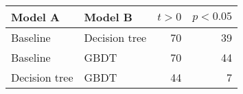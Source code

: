 \begin{tabular}{llrr}
  \toprule
  Model A       & Model B       & $t > 0$ & $p < 0.05$
  \\
  \midrule
  Baseline      & Decision tree & 70      & 39
  \\
  Baseline      & GBDT          & 70      & 44
  \\
  Decision tree & GBDT          & 44      & 7
  \\
  \bottomrule
\end{tabular}
